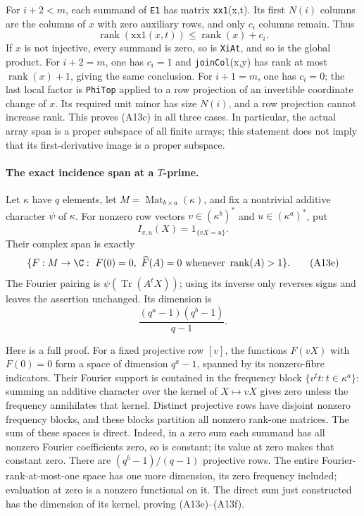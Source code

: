 For $i+2<m$, each summand of \texttt{E1} has matrix
\texttt{xx1}(x,t).  Its first $N(i)$ columns are the columns
of $x$ with zero auxiliary rows, and only $c_i$ columns
remain.  Thus
\[
       \operatorname{rank}(\mathrm{xx1}(x,t))
                     \leq\operatorname{rank}(x)+c_i.
\]
If $x$ is not injective, every summand is zero, so is
\texttt{XiAt}, and so is the global product.
For $i+2=m$, one has $c_i=1$ and
\texttt{joinCol}(x,y) has rank at most
$\operatorname{rank}(x)+1$, giving the same conclusion.
For $i+1=m$, one has $c_i=0$; the last local factor is
\texttt{PhiTop} applied to a row projection of an invertible
coordinate change of $x$.  Its required unit minor has size
$N(i)$, and a row projection cannot increase rank.
This proves (A13c) in all three cases.  In particular, the
actual array span is a proper subspace of all finite arrays;
this statement does not imply that its first-derivative image
is a proper subspace.

\paragraph{The exact incidence span at a $T$-prime.}
Let $\kappa$ have $q$ elements, let
$M=\operatorname{Mat}_{b\times a}(\kappa)$, and fix a nontrivial
additive character $\psi$ of $\kappa$.
For nonzero row vectors $v\in(\kappa^b)^*$ and
$u\in(\kappa^a)^*$, put
\[
                    I_{v,u}(X)=1_{\{vX=u\}}.
                    \tag{A13d}
\]
Their complex span is exactly
\[
 \{F:M\to\C:\ F(0)=0,
       \ \widehat F(A)=0\text{ whenever }\operatorname{rank}(A)>1\}.
 \tag{A13e}
\]
The Fourier pairing is $\psi(\operatorname{Tr}(A^tX))$;
using its inverse only reverses signs and leaves the assertion
unchanged.  Its dimension is
\[
                 \frac{(q^a-1)(q^b-1)}{q-1}.
                 \tag{A13f}
\]

Here is a full proof.  For a fixed projective row $[v]$,
the functions $F(vX)$ with $F(0)=0$ form a space of
dimension $q^a-1$, spanned by its nonzero-fibre indicators.
Their Fourier support is contained in the frequency block
$\{v^tt:t\in\kappa^a\}$: summing an additive character over
the kernel of $X\mapsto vX$ gives zero unless the frequency
annihilates that kernel.  Distinct projective rows have disjoint
nonzero frequency blocks, and these blocks partition all
nonzero rank-one matrices.  The sum of these spaces is direct.
Indeed, in a zero sum each summand has all nonzero Fourier
coefficients zero, so is constant; its value at zero makes
that constant zero.  There are $(q^b-1)/(q-1)$ projective
rows.  The entire Fourier-rank-at-most-one space has one more
dimension, its zero frequency included; evaluation at zero
is a nonzero functional on it.  The direct sum just constructed
has the dimension of its kernel, proving (A13e)--(A13f).

